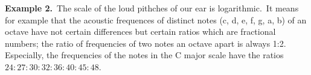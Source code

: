 \documentclass[12pt]{article}
\theoremstyle{definition}
\begin{document}
\textbf{Example 2.}\, The scale of the loud pithches of our ear is logarithmic.\, It means for example that the acoustic frequences of distinct notes (c, d, e, f, g, a, b) of an octave have not certain differences but certain ratios which are  fractional numbers; the ratio of frequencies of two notes an octave apart is always 1:2.\, Especially, the frequencies of the notes in the C major scale have the ratios $24:27:30:32:36:40:45:48$.


\end{document}
